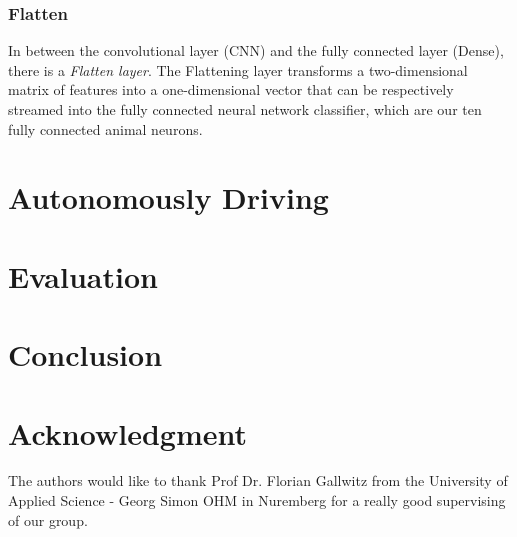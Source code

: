 \documentclass[journal]{IEEEtran}
\begin{document}
\subsubsection{Flatten}
In between the convolutional layer (CNN) and the fully connected layer (Dense), there is a \textit{Flatten layer}. The Flattening layer transforms a two-dimensional matrix of features into a one-dimensional vector that can be respectively streamed into the fully connected neural network classifier, which are our ten fully connected animal neurons. \\


\section{Autonomously Driving}
\label{sec:AutonomouslyDriving}

\section{Evaluation}

\section{Conclusion}

\section*{Acknowledgment}
\noindent The authors would like to thank Prof Dr. Florian Gallwitz from the University of Applied Science - Georg Simon OHM in Nuremberg for a really good supervising of our group. 




%
\end{document}
